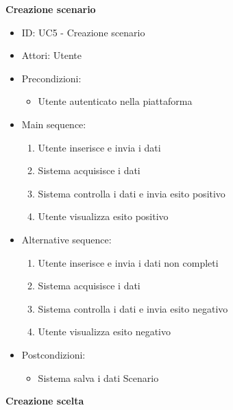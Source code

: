\documentclass{article}
\begin{document}
\textbf{Creazione scenario}
\begin{itemize}[label = { }]
    \itemsep0px
    \item ID: UC5 - Creazione scenario
    \item Attori: Utente
    \item Precondizioni: 
        \begin{itemize}[label = {-}]
            \item Utente autenticato nella piattaforma
        \end{itemize}
    \item Main sequence: 
        \begin{enumerate}
            \item Utente inserisce e invia i dati
            \item Sistema acquisisce i dati
            \item Sistema controlla i dati e invia esito positivo
            \item Utente visualizza esito positivo
        \end{enumerate}
    \item Alternative sequence:
        \begin{enumerate}
            \item Utente inserisce e invia i dati non completi
            \item Sistema acquisisce i dati
            \item Sistema controlla i dati e invia esito negativo
            \item Utente visualizza esito negativo
        \end{enumerate}
    \item Postcondizioni: 
        \begin{itemize}[label = {-}]
            \item Sistema salva i dati Scenario
        \end{itemize}
\end{itemize}
\textbf{Creazione scelta}
\end{document}
